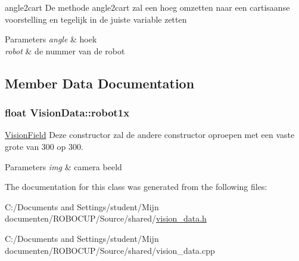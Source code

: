 angle2cart De methode angle2cart zal een hoeg omzetten naar een cartisaanse voorstelling en tegelijk in de juiste variable zetten 


\begin{DoxyParams}{Parameters}
{\em angle} & hoek \\
\hline
{\em robot} & de nummer van de robot \\
\hline
\end{DoxyParams}


\subsection{Member Data Documentation}
\hypertarget{class_vision_data_af98a9bee656ef6430673f408cee45da2}{
\subsubsection[{robot1x}]{\setlength{\rightskip}{0pt plus 5cm}float Vision\-Data\-::robot1x}}\label{class_vision_data_af98a9bee656ef6430673f408cee45da2}


\hyperlink{class_vision_field}{Vision\-Field} Deze constructor zal de andere constructor oproepen met een vaste grote van 300 op 300. 


\begin{DoxyParams}{Parameters}
{\em img} & camera beeld \\
\hline
\end{DoxyParams}


The documentation for this class was generated from the following files\-:\begin{DoxyCompactItemize}
\item 
C\-:/\-Documents and Settings/student/\-Mijn documenten/\-R\-O\-B\-O\-C\-U\-P/\-Source/shared/\hyperlink{vision__data_8h}{vision\-\_\-data.\-h}\item 
C\-:/\-Documents and Settings/student/\-Mijn documenten/\-R\-O\-B\-O\-C\-U\-P/\-Source/shared/vision\-\_\-data.\-cpp\end{DoxyCompactItemize}
